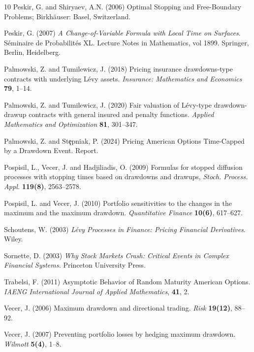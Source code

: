 \documentclass[10pt]{amsart}
\begin{document}
\begin{thebibliography}{10}
			 Peskir, G. and Shiryaev, A.N. (2006) Optimal Stopping and Free-Boundary Problems; Birkh\"{a}user: Basel, Switzerland.
			
			 Peskir, G. (2007) \textit{A Change-of-Variable Formula with Local Time on Surfaces}. Séminaire de Probabilités XL. Lecture Notes in Mathematics, vol 1899. Springer, Berlin, Heidelberg. %
			
			
			Palmowski, Z. and Tumilewicz, J. (2018)
			Pricing insurance drawdowns-type contracts with underlying L\'evy assets.
			{\it Insurance: Mathematics and Economics} {\bf 79}, 1--14.
			
			Palmowski, Z. and Tumilewicz, J. (2020)
			Fair valuation of L\'evy-type drawdown-drawup contracts with general insured and penalty functions.
			{\it Applied Mathematics and Optimization} {\bf 81}, 301--347.
			
			Palmowski, Z. and St\c{e}pniak, P. (2024)
			Pricing American Options Time-Capped by a Drawdown Event.
			Report. %
			
			
			Pospisil, L., Vecer, J. and Hadjiliadis, O. (2009) Formulas for stopped diffusion processes with stopping times based on drawdowns and drawups,
			{\it Stoch. Process. Appl.} {\bf 119(8)}, 2563--2578.
			
			Pospisil, L. and Vecer, J. (2010) Portfolio sensitivities to the changes in the maximum and
			the maximum drawdown. {\it Quantitative Finance} {\bf 10(6)}, 617--627.
			
			Schoutens, W. (2003)
			{\it {L}\'evy Processes in Finance: Pricing Financial Derivatives}.
			Wiley.
			
			Sornette, D. (2003) {\it Why Stock Markets Crash: Critical Events in Complex Financial Systems.}
			Princeton University Press.
			
			 Trabelsi, F. (2011) Asymptotic Behavior of Random Maturity American Options. {\it IAENG International Journal of Applied Mathematics}, {\bf 41}, 2.
			
			
			Vecer, J. (2006) Maximum drawdown and directional trading. {\it Risk} {\bf 19(12)}, 88--92.
			
			Vecer, J. (2007) Preventing portfolio losses by hedging maximum drawdown. {\it Wilmott} {\bf 5(4)},
			1--8.
			

\end{thebibliography}
\end{document}

